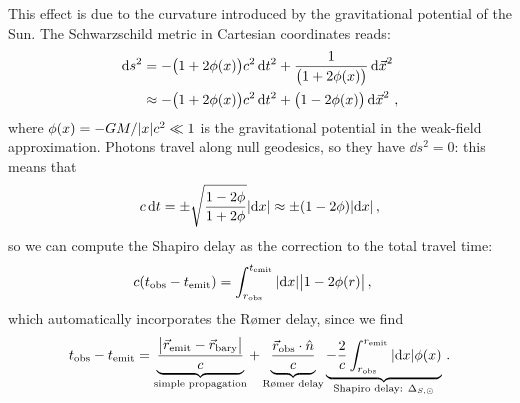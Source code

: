 \documentclass[main.tex]{subfiles}
\begin{document}

This effect is due to the curvature introduced by the gravitational potential of the Sun. 
The Schwarzschild metric in Cartesian coordinates reads: 
%
\begin{align}
\dd{s^2} &= - \qty(1 + 2 \phi (x)) c^2 \dd{t^2} + \frac{1}{\qty(1 + 2 \phi (x))} \dd{\vec{x}}^2  \\
&\approx - \qty(1 + 2 \phi (x)) c^2 \dd{t^2} + \qty(1 - 2 \phi (x)) \dd{\vec{x}}^2
\,,
\end{align}
%
where \(\phi (x) = -GM / \abs{x}c^2 \ll 1\) is the gravitational potential in the weak-field approximation.
Photons travel along null geodesics, so they have \(\dd{s}^2 = 0\): this means that 
%
\begin{align}
c\dd{t} = \pm\sqrt{\frac{1 - 2 \phi }{1 + 2 \phi }} \abs{\dd{x}}
\approx \pm \qty(1 - 2 \phi ) \abs{ \dd{x}} 
\,,
\end{align}
%
so we can compute the Shapiro delay as the correction to the total travel time:
%
\begin{align}
c \qty(t _{\text{obs}} - t _{\text{emit}}) 
&= \int_{r _{\text{obs}}}^{t _{\text{emit}}} \abs{ \dd{x}} \abs{1 - 2 \phi (r)} 
\,,
\end{align}
%
which automatically incorporates the Rømer delay, since we find 
%
\begin{align}
t _{\text{obs}} - t _{\text{emit}} =  \underbrace{\frac{\abs{\vec{r} _{\text{emit}} - \vec{r} _{\text{bary}}}}{c}}_{\text{simple propagation}} + \underbrace{\frac{\vec{r} _{\text{obs}} \cdot \hat{n}}{c}}_{\text{Rømer delay}}
\underbrace{- \frac{2}{c} \int_{r _{\text{obs}}}^{r _{\text{emit}}} \abs{ \dd{x}} \phi (x)}_{\text{Shapiro delay: } \Delta_{S, \odot}}
\,.
\end{align}
%
\end{document}
